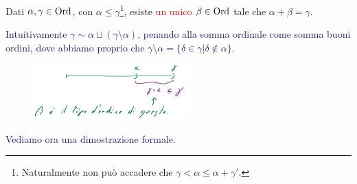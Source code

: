 \begin{lemma}
	Dati $\alpha, \gamma \in \operatorname{Ord}$, con $\alpha \leq \gamma$\footnote{Naturalmente non può accadere che $\gamma < \alpha \leq \alpha + \gamma '$.}, esiste \textcolor{red}{un unico} $\beta \in \operatorname{Ord}$ tale che $\alpha + \beta = \gamma$.
\end{lemma}

\textcolor{MidnightBlue}{Intuitivamente $\gamma \sim \alpha \sqcup (\gamma\setminus\alpha)$, penando alla somma ordinale come somma buoni ordini, dove abbiamo proprio che $\gamma\setminus\alpha = \{\delta \in \gamma | \delta \not \in \alpha\}$}.
\begin{figure}[H]
	\centering
	\includegraphics[width = 6.0cm]{immagini/sottrazione_ordinali.png}
\end{figure}

\textcolor{MidnightBlue}{Vediamo ora una dimostrazione formale.}

